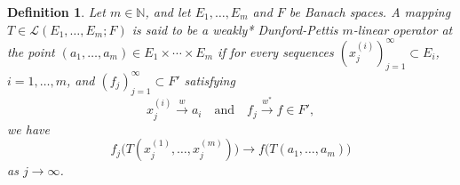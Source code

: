 \documentclass[12 pt]{article}%
\newtheorem{final remark}[theorem]{Final Remark}
\newtheorem{definition}[theorem]{Definition}
\begin{document}
%
%


\begin{definition}\label{WDP*ML}
	Let $m \in \mathbb{N}$, and let $E_1,\dots, E_m$ and $F$ be Banach spaces. A mapping $T \in \mathcal{L}(E_1,\dots, E_m; F)$ is said to be a \emph{weakly* Dunford-Pettis $m$-linear operator at the point} $(a_1,\dots, a_m) \in E_1 \times \cdots \times E_m$ if for every sequences $(x_j^{(i)})_{j=1}^{\infty} \subset E_i$, $i=1,\dots, m$, and $(f_j)_{j=1}^{\infty} \subset F'$ satisfying
	\begin{equation*}
		x_j^{(i)} \overset{w}{\longrightarrow} a_i \quad \text{and} \quad f_j \overset{w^*}{\longrightarrow} f \in F',
	\end{equation*}
	we have
	\begin{equation*}
		f_j\big(T(x_j^{(1)},\dots, x_j^{(m)})\big) \longrightarrow f\big(T(a_1,\dots, a_m)\big)
	\end{equation*}
	as $j \to \infty$.
\end{definition}
\end{document}
